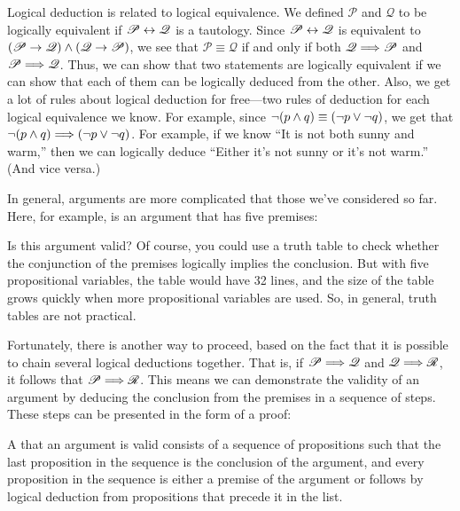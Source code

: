 Logical deduction is related to logical equivalence.
We defined $\mathscr{P}$ and $\mathscr{Q}$ to be
logically equivalent if $\mathscr{P}\leftrightarrow\mathscr{Q}$ is
a tautology.  Since $\mathscr{P}\leftrightarrow\mathscr{Q}$ is equivalent
to $(\mathscr{P}\rightarrow\mathscr{Q})\wedge(\mathscr{Q}\rightarrow\mathscr{P})$,
we see that  $\mathscr{P}\equiv \mathscr{Q}$ if and only if both
$\mathscr{Q}\Longrightarrow\mathscr{P}$ and $\mathscr{P}\Longrightarrow\mathscr{Q}$.
Thus, we can show that two statements are logically equivalent if
we can show that each of them can be logically deduced from the
other.  Also, we get a lot of rules about logical deduction for 
free---two rules of deduction for each logical equivalence we know.  For
example, since $\lnot(p\wedge q)\equiv (\lnot p\vee \lnot q)$,
we get that $\lnot(p\wedge q)\Longrightarrow (\lnot p\vee \lnot q)$.
For example, if we know  ``It is not both sunny and warm,'' 
then we can logically deduce ``Either it's not sunny or it's not warm.''
(And vice versa.)


\medskip


In general, arguments are more complicated that those we've considered
so far.  Here, for example, is an argument that has five premises:
\begin{center}
\end{center}
Is this argument valid?  Of course, you could use a truth table
to check whether the conjunction of the premises logically implies
the conclusion.  But with five propositional variables, the table
would have 32 lines, and the size of the table grows quickly when
more propositional variables are used.  So, in general, truth
tables are not practical.  

Fortunately, there is another way to proceed, based on the fact that
it is possible to chain several logical deductions together.
That is, if $\mathscr{P}\Longrightarrow\mathscr{Q}$ and
$\mathscr{Q}\Longrightarrow\mathscr{R}$, it follows that
$\mathscr{P}\Longrightarrow\mathscr{R}$.  This means we can demonstrate the
validity of an argument by deducing the conclusion from the
premises in a sequence of steps.  These steps can be presented
in the form of a proof:

\begin{definition}
A  that an argument is valid consists of a
sequence of propositions such that the last proposition in the
sequence is the conclusion of the argument, and every proposition
in the sequence is either a premise of the argument or follows
by logical deduction from propositions that precede it in the list.
\end{definition}

